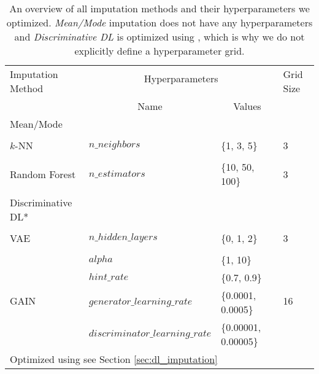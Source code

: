 \begin{table}[]
	\centering
	\begin{tabular}{@{}llll@{}}
		\toprule
		\multirow{2}{*}{Imputation Method} & \multicolumn{2}{c}{Hyperparameters}                          & \multirow{2}{*}{Grid Size} \\\cline{2-3}
		\\[-0.75em]
		& \multicolumn{1}{c}{Name}        & \multicolumn{1}{c}{Values} &                            \\ \midrule
		Mean/Mode                         &                                 &                            &                           \\
		\\[-0.5em]
		$k$-NN                             & $n\_neighbors$                  & \{1, 3, 5\}                & 3                          \\
		\\[-0.5em]
		Random Forest                      & $n\_estimators$                 & \{10, 50, 100\}            & 3                          \\
		\\[-0.5em]
		Discriminative DL*                   &                                 &                            &                            \\
		\\[-0.5em]
		VAE                                & $n\_hidden\_layers$             & \{0, 1, 2\}                & 3                          \\
		\\[-0.5em]
		\multirow{4}{*}{GAIN}              & $alpha$                         & \{1, 10\}                  & \multirow{4}{*}{16}        \\
		& $hint\_rate$                    & \{0.7, 0.9\}               &                            \\
		& $generator\_learning\_rate$     & \{0.0001, 0.0005\}         &                            \\
		& $discriminator\_learning\_rate$ & \{0.00001, 0.00005\}       &                            \\ \bottomrule
		\multicolumn{4}{l}{\footnotesize*Optimized using \code{autokeras} see Section \ref{sec:dl_imputation}}
	\end{tabular}
	\caption{An overview of all imputation methods and their hyperparameters we optimized. \emph{Mean/Mode} imputation does not have any hyperparameters and \emph{Discriminative DL} is optimized using , which is why we do not explicitly define a hyperparameter grid.}
	\label{tab:HPO}
\end{table}



